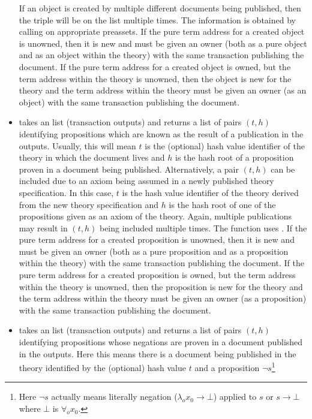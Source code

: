 \begin{itemize}
If an object is created by multiple
different documents being published, then the triple will be on the list multiple times.
The information is obtained by calling {} on appropriate preassets.
If the pure term address for a created object is unowned,
then it is new and must be given an owner (both as a pure object
and as an object within the theory) with the same transaction
publishing the document.
If the pure term address for a created object is owned,
but the term address within the theory is unowned, then
the object is new for the theory and the term address within the theory
must be given an owner (as an object) with the same transaction
publishing the document.
\item {} takes
an {} list (transaction outputs)
and returns a list of pairs $(t,h)$
identifying propositions which are known as the result of a publication in the outputs.
Usually, this will mean $t$ is the (optional) hash value identifier of the theory in which the document lives
and $h$ is the hash root of a proposition proven in a document being published.
Alternatively, a pair $(t,h)$ can be included due to an axiom being assumed in a newly published theory
specification. In this case, $t$ is the hash value identifier of the theory derived from the
new theory specification and $h$ is the hash root of one of the propositions given as an axiom of the theory.
Again, multiple publications may result in $(t,h)$ being included multiple times.
The function uses {}.
If the pure term address for a created proposition is unowned,
then it is new and must be given an owner (both as a pure proposition
and as a proposition within the theory) with the same transaction
publishing the document.
If the pure term address for a created proposition is owned,
but the term address within the theory is unowned, then
the proposition is new for the theory and the term address within the theory
must be given an owner (as a proposition) with the same transaction
publishing the document.
\item {} takes
an {} list (transaction outputs)
and returns a list of pairs $(t,h)$
identifying propositions whose negations are proven in a document published in the outputs.
Here this means there is a document being published in the theory identified by the
(optional) hash value $t$
and a proposition $\neg s$\footnote{Here $\neg s$ actually means literally negation ($\lambda_o x_0\to\bot$) applied to $s$ or $s\to\bot$ where $\bot$ is $\forall_o x_0$.}

\end{itemize}
